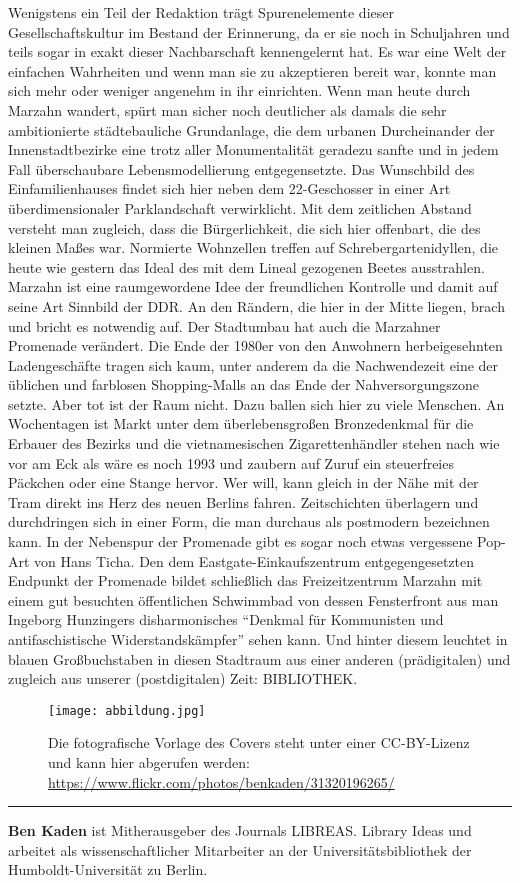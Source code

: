 \documentclass[a4paper,
fontsize=11pt,
oneside,
numbers=noperiodatend,
parskip=half-,
bibliography=totoc,
final
]{scrartcl}
\begin{document}
Wenigstens ein Teil der Redaktion trägt Spurenelemente dieser
Gesellschaftskultur im Bestand der Erinnerung, da er sie noch in
Schuljahren und teils sogar in exakt dieser Nachbarschaft kennengelernt
hat. Es war eine Welt der einfachen Wahrheiten und wenn man sie zu
akzeptieren bereit war, konnte man sich mehr oder weniger angenehm in
ihr einrichten. Wenn man heute durch Marzahn wandert, spürt man sicher
noch deutlicher als damals die sehr ambitionierte städtebauliche
Grundanlage, die dem urbanen Durcheinander der Innenstadtbezirke eine
trotz aller Monumentalität geradezu sanfte und in jedem Fall
überschaubare Lebensmodellierung entgegensetzte. Das Wunschbild des
Einfamilienhauses findet sich hier neben dem 22-Geschosser in einer Art
überdimensionaler Parklandschaft verwirklicht. Mit dem zeitlichen
Abstand versteht man zugleich, dass die Bürgerlichkeit, die sich hier
offenbart, die des kleinen Maßes war. Normierte Wohnzellen treffen auf
Schrebergartenidyllen, die heute wie gestern das Ideal des mit dem
Lineal gezogenen Beetes ausstrahlen. Marzahn ist eine raumgewordene Idee
der freundlichen Kontrolle und damit auf seine Art Sinnbild der DDR. An
den Rändern, die hier in der Mitte liegen, brach und bricht es notwendig
auf. Der Stadtumbau hat auch die Marzahner Promenade verändert. Die Ende
der 1980er von den Anwohnern herbeigesehnten Ladengeschäfte tragen sich
kaum, unter anderem da die Nachwendezeit eine der üblichen und farblosen
Shopping-Malls an das Ende der Nahversorgungszone setzte. Aber tot ist
der Raum nicht. Dazu ballen sich hier zu viele Menschen. An Wochentagen
ist Markt unter dem überlebensgroßen Bronzedenkmal für die Erbauer des
Bezirks und die vietnamesischen Zigarettenhändler stehen nach wie vor am
Eck als wäre es noch 1993 und zaubern auf Zuruf ein steuerfreies
Päckchen oder eine Stange hervor. Wer will, kann gleich in der Nähe mit
der Tram direkt ins Herz des neuen Berlins fahren. Zeitschichten
überlagern und durchdringen sich in einer Form, die man durchaus als
postmodern bezeichnen kann. In der Nebenspur der Promenade gibt es sogar
noch etwas vergessene Pop-Art von Hans Ticha. Den dem
Eastgate-Einkaufszentrum entgegengesetzten Endpunkt der Promenade bildet
schließlich das Freizeitzentrum Marzahn mit einem gut besuchten
öffentlichen Schwimmbad von dessen Fensterfront aus man Ingeborg
Hunzingers disharmonisches \enquote{Denkmal für Kommunisten und
antifaschistische Widerstandskämpfer} sehen kann. Und hinter diesem
leuchtet in blauen Großbuchstaben in diesen Stadtraum aus einer anderen
(prädigitalen) und zugleich aus unserer (postdigitalen) Zeit:
BIBLIOTHEK.

\begin{figure}
\centering
\texttt{[image: abbildung.jpg]}
\caption{Die fotografische Vorlage des Covers steht unter einer
CC-BY-Lizenz und kann hier abgerufen werden:
\url{https://www.flickr.com/photos/benkaden/31320196265/}}
\end{figure}

\begin{center}\rule{0.5\linewidth}{\linethickness}\end{center}

\textbf{Ben Kaden} ist Mitherausgeber des Journals LIBREAS. Library
Ideas und arbeitet als wissenschaftlicher Mitarbeiter an der
Universitätsbibliothek der Humboldt-Universität zu Berlin.
\end{document}
